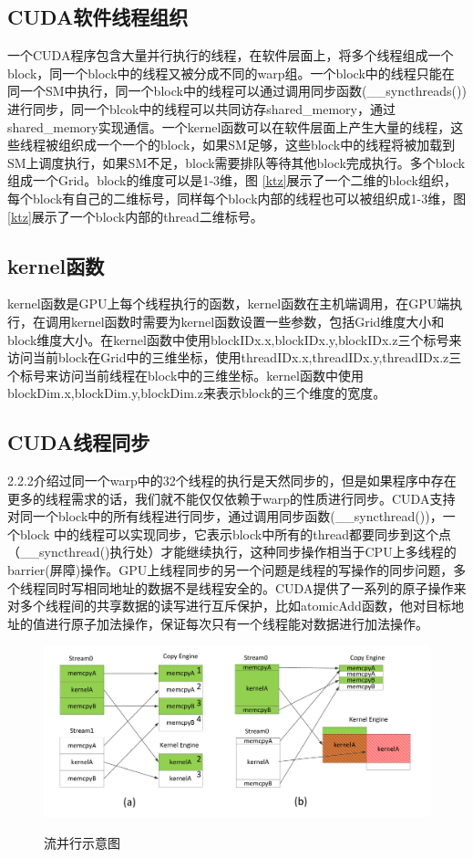 \subsection{CUDA软件线程组织}
一个CUDA程序包含大量并行执行的线程，在软件层面上，将多个线程组成一个block，同一个block中的线程又被分成不同的warp组。一个block中的线程只能在同一个SM中执行，同一个block中的线程可以通过调用同步函数(\_\_syncthreads())进行同步，同一个blcok中的线程可以共同访存shared\_memory，通过shared\_memory实现通信。一个kernel函数可以在软件层面上产生大量的线程，这些线程被组织成一个一个的block，如果SM足够，这些block中的线程将被加载到SM上调度执行，如果SM不足，block需要排队等待其他block完成执行。多个block组成一个Grid。block的维度可以是1-3维，图 \ref{ktz}展示了一个二维的block组织，每个block有自己的二维标号，同样每个block内部的线程也可以被组织成1-3维，图 \ref{ktz}展示了一个block内部的thread二维标号。

\subsection{kernel函数}
kernel函数是GPU上每个线程执行的函数，kernel函数在主机端调用，在GPU端执行，在调用kernel函数时需要为kernel函数设置一些参数，包括Grid维度大小和block维度大小。在kernel函数中使用blockIDx.x,blockIDx.y,blockIDx.z三个标号来访问当前block在Grid中的三维坐标，使用threadIDx.x,threadIDx.y,threadIDx.z三个标号来访问当前线程在block中的三维坐标。kernel函数中使用blockDim.x,blockDim.y,blockDim.z来表示block的三个维度的宽度。

\subsection{CUDA线程同步}
2.2.2介绍过同一个warp中的32个线程的执行是天然同步的，但是如果程序中存在更多的线程需求的话，我们就不能仅仅依赖于warp的性质进行同步。CUDA支持对同一个block中的所有线程进行同步，通过调用同步函数(\_\_syncthread())，一个block 中的线程可以实现同步，它表示block中所有的thread都要同步到这个点（\_\_syncthread()执行处）才能继续执行，这种同步操作相当于CPU上多线程的barrier(屏障)操作。GPU上线程同步的另一个问题是线程的写操作的同步问题，多个线程同时写相同地址的数据不是线程安全的。CUDA提供了一系列的原子操作来对多个线程间的共享数据的读写进行互斥保护，比如atomicAdd函数，他对目标地址的值进行原子加法操作，保证每次只有一个线程能对数据进行加法操作。
\begin{figure}
\setlength{\abovecaptionskip}{-0.5cm}
\begin{center}
{\includegraphics[width=1 \textwidth]{figures/flow.pdf}}
\end{center}
\caption{{\footnotesize{流并行示意图}}}
\label{flow}
\end{figure}
